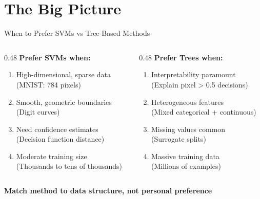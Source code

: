 \documentclass[aspectratio=169]{beamer}
\begin{document}

\section{The Big Picture}

\begin{frame}{When to Prefer SVMs vs Tree-Based Methods}

\begin{columns}[T]
\begin{column}{0.48\textwidth}
\textbf{Prefer SVMs when:}
\begin{enumerate}
\item High-dimensional, sparse data\\
\small{(MNIST: 784 pixels)}
\item Smooth, geometric boundaries\\
\small{(Digit curves)}
\item Need confidence estimates\\
\small{(Decision function distance)}
\item Moderate training size\\
\small{(Thousands to tens of thousands)}
\end{enumerate}
\end{column}

\begin{column}{0.48\textwidth}
\textbf{Prefer Trees when:}
\begin{enumerate}
\item Interpretability paramount\\
\small{(Explain pixel > 0.5 decisions)}
\item Heterogeneous features\\
\small{(Mixed categorical + continuous)}
\item Missing values common\\
\small{(Surrogate splits)}
\item Massive training data\\
\small{(Millions of examples)}
\end{enumerate}
\end{column}
\end{columns}

\vspace{0.5cm}
\centering
\textbf{Match method to data structure, not personal preference}

\end{frame}
\end{document}
